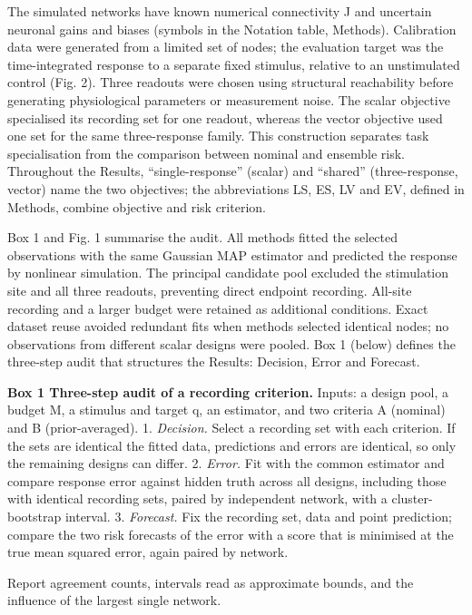 The simulated networks have known numerical connectivity J and uncertain neuronal gains and biases (symbols in the Notation table, Methods). Calibration data were generated from a limited set of nodes; the evaluation target was the time-integrated response to a separate fixed stimulus, relative to an unstimulated control (Fig. 2). Three readouts were chosen using structural reachability before generating physiological parameters or measurement noise. The scalar objective specialised its recording set for one readout, whereas the vector objective used one set for the same three-response family. This construction separates task specialisation from the comparison between nominal and ensemble risk. Throughout the Results, ``single-response'' (scalar) and ``shared'' (three-response, vector) name the two objectives; the abbreviations LS, ES, LV and EV, defined in Methods, combine objective and risk criterion.

Box 1 and Fig. 1 summarise the audit. All methods fitted the selected observations with the same Gaussian MAP estimator and predicted the response by nonlinear simulation. The principal candidate pool excluded the stimulation site and all three readouts, preventing direct endpoint recording. All-site recording and a larger budget were retained as additional conditions. Exact dataset reuse avoided redundant fits when methods selected identical nodes; no observations from different scalar designs were pooled. Box 1 (below) defines the three-step audit that structures the Results: Decision, Error and Forecast.

\textbf{Box 1 \textbar{} Three-step audit of a recording criterion.} Inputs: a design pool, a budget M, a stimulus and target q, an estimator, and two criteria A (nominal) and B (prior-averaged). 1. \emph{Decision.} Select a recording set with each criterion. If the sets are identical the fitted data, predictions and errors are identical, so only the remaining designs can differ. 2. \emph{Error.} Fit with the common estimator and compare response error against hidden truth across all designs, including those with identical recording sets, paired by independent network, with a cluster-bootstrap interval. 3. \emph{Forecast.} Fix the recording set, data and point prediction; compare the two risk forecasts of the error with a score that is minimised at the true mean squared error, again paired by network.

Report agreement counts, intervals read as approximate bounds, and the influence of the largest single network.

